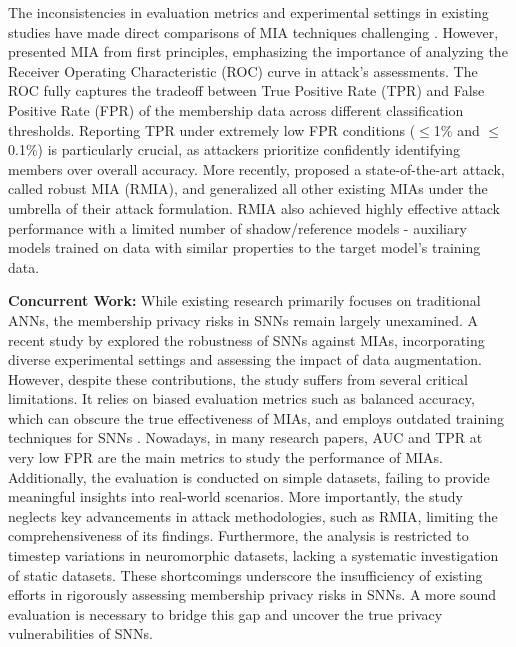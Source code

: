 The inconsistencies in evaluation metrics and experimental settings in existing studies have made direct comparisons of MIA techniques challenging \citep{hu2023defenses}. However, \citet{carlini2022membership} presented MIA from first principles, emphasizing the importance of analyzing the Receiver Operating Characteristic (ROC) curve in attack's assessments. The ROC fully captures the tradeoff between True Positive Rate (TPR) and False Positive Rate (FPR) of the membership data across different classification thresholds. Reporting TPR under extremely low FPR conditions ($\leq$1\% and $\leq$ 0.1\%) is particularly crucial, as attackers prioritize confidently identifying members over overall accuracy. More recently, \citet{zarifzadeh2024low} proposed a state-of-the-art attack, called robust MIA (RMIA), and generalized all other existing MIAs under the umbrella of their attack formulation. RMIA also achieved highly effective attack performance with a limited number of shadow/reference models - auxiliary models trained on data with similar properties to the target model's training data.

\textbf{Concurrent Work: } While existing research primarily focuses on traditional ANNs, the membership privacy risks in SNNs remain largely unexamined. A recent study by \citet{li2024membership} explored the robustness of SNNs against MIAs, incorporating diverse experimental settings and assessing the impact of data augmentation. However, despite these contributions, the study suffers from several critical limitations. It relies on biased evaluation metrics such as balanced accuracy, which can obscure the true effectiveness of MIAs, and employs outdated training techniques for SNNs \citep{carlini2022membership}. Nowadays, in many research papers, AUC and TPR at very low FPR are the main metrics to study the performance of MIAs.
Additionally, the evaluation is conducted on simple datasets, failing to provide meaningful insights into real-world scenarios. 
%
More importantly, the study neglects key advancements in attack methodologies, such as RMIA, limiting the comprehensiveness of its findings. Furthermore, the analysis is restricted to timestep variations in neuromorphic datasets, lacking a systematic investigation of static datasets. These shortcomings underscore the insufficiency of existing efforts in rigorously assessing membership privacy risks in SNNs. A more sound evaluation is necessary to bridge this gap and uncover the true privacy vulnerabilities of SNNs.

\vspace{-0.3cm}